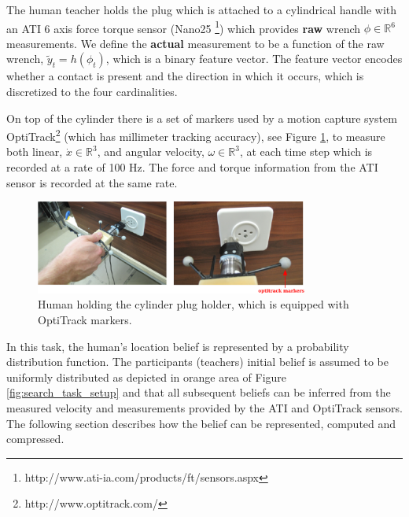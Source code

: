The human teacher holds the plug which is attached to a cylindrical handle with 
an ATI 6 axis force torque sensor (Nano25 \footnote{http://www.ati-ia.com/products/ft/sensors.aspx}) 
which provides \textbf{raw} wrench $\phi \in \mathbb{R}^6$ measurements. We define the \textbf{actual} measurement 
to be a function of the raw wrench, $\tilde{y}_t = h(\phi_t)$, which is a binary feature vector. The feature vector encodes whether a contact is present 
and the direction in which it occurs, which is discretized to the four cardinalities.

On top of the cylinder there is a set of markers used by a motion capture system OptiTrack\footnote{http://www.optitrack.com/}
(which has millimeter tracking accuracy), 
see Figure \ref{fig:plug_cylinder}, to measure both linear, $\dot{x} \in \mathbb{R}^3$, and angular 
velocity, $\omega \in \mathbb{R}^3$, at each time step which is recorded at a rate of 100 Hz. The force and torque information 
from the ATI sensor is recorded at the same rate. 

\begin{figure}
 \centering
 \includegraphics[width=0.8\textwidth]{./ch4-PiH/Figures/Fig/plug_socket_closeup.pdf}
 \caption{Human holding the cylinder plug holder, which is equipped with OptiTrack markers.}
 \label{fig:plug_cylinder}
\end{figure}

In this task, the human's location belief is represented by a probability distribution function. 
The participants (teachers) initial belief is assumed to be uniformly distributed as depicted 
in orange area of Figure \ref{fig:search_task_setup} and that all subsequent beliefs can be inferred from the measured velocity 
and measurements provided by the ATI and OptiTrack sensors. The following section describes how the belief can be represented, 
computed and compressed.

